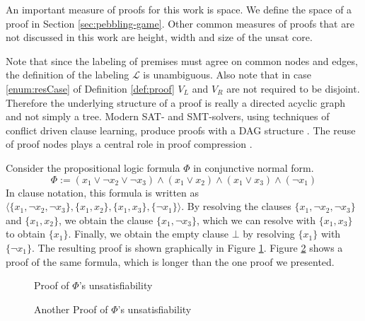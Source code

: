 An important measure of proofs for this work is space.
We define the space of a proof in Section \ref{sec:pebbling-game}.
Other common measures of proofs that are not discussed in this work are height, width and size of the unsat core.

\noindent
Note that since the labeling of premises must agree on common nodes and edges, the definition of the labeling $\mathcal{L}$ is unambiguous.
Also note that in case \ref{enum:resCase} of Definition \ref{def:proof} $V_L$ and $V_R$ are not required to be disjoint. 
Therefore the underlying structure of a proof is really a directed acyclic graph and not simply a tree. 
Modern SAT- and SMT-solvers, using techniques of conflict driven clause learning, produce proofs with a  DAG structure \cite{Bouton2009,Biere2009}.
The reuse of proof nodes plays a central role in proof compression \cite{Fontaine2011}.

\begin{example}

Consider the propositional logic formula $\Phi$ in conjunctive normal form.
$$\Phi := (x_1 \vee \neg x_2 \vee \neg x_3) \wedge (x_1 \vee x_2) \wedge (x_1 \vee x_3) \wedge (\neg x_1)$$
In clause notation, this formula is written as $\langle \{x_1, \neg x_2, \neg x_3\}, \{x_1, x_2\}, \{x_1, x_3\}, \{\neg x_1\} \rangle$.
By resolving the clauses $\{x_1, \neg x_2, \neg x_3\}$ and $\{x_1, x_2\}$, we obtain the clause $\{x_1,\neg x_3\}$, which we can resolve with $\{x_1, x_3\}$ to obtain $\{x_1\}$.
Finally, we obtain the empty clause $\bot$ by resolving $\{x_1\}$ with $\{\neg x_1\}$.
The resulting proof is shown graphically in Figure \ref{fig:resolutionexample}.
Figure \ref{fig:resolutionexample2} shows a proof of the same formula, which is longer than the one proof we presented.

\begin{figure}[!h]


\caption{Proof of $\Phi$'s unsatisfiability}
\label{fig:resolutionexample}
\end{figure}

\begin{figure}[!h]


\caption{Another Proof of $\Phi$'s unsatisfiability}
\label{fig:resolutionexample2}
\end{figure}

\end{example}